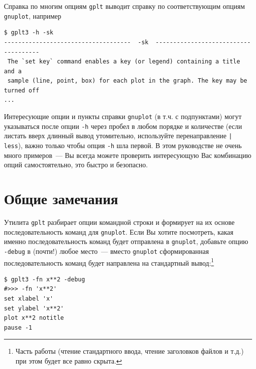 \documentclass[12pt]{article}
\def\gplt{{\tt gplt}}
\def\gnuplot{{\tt gnuplot}}
\begin{document}
Справка по многим опциям \gplt{} выводит справку по соответствующим опциям \gnuplot, например
\begin{verbatim}
$ gplt3 -h -sk
------------------------------------  -sk  -------------------------------------
 The `set key` command enables a key (or legend) containing a title and a
 sample (line, point, box) for each plot in the graph. The key may be turned off
...
\end{verbatim}

Интересующие опции и пункты справки \gnuplot{} (в т.ч. с подпунктами) могут указываться после опции \verb'-h' через пробел в любом порядке и количестве
(если листать вверх длинный вывод утомительно, используйте перенаправление \verb'| less'), важно только чтобы опция \verb'-h' шла первой.
В этом руководстве не очень много примеров~--- Вы всегда можете проверить интересующую Вас комбинацию опций самостоятельно, это быстро и безопасно. 
\pagebreak

\section{Общие замечания}\label{main:sec}
Утилита \gplt{} разбирает опции командной строки и формирует на их основе последовательность команд для \gnuplot. Если Вы хотите посмотреть,
какая именно последовательность команд будет отправлена в \gnuplot, добавьте опцию \verb'-debug' в (почти!) любое место~--- вместо \gnuplot{}
сформированная последовательность команд будет направлена на стандартный вывод:\footnote{Часть работы
  (чтение стандартного ввода, чтение заголовков файлов и т.д.) при этом будет все равно скрыта.}
\begin{figure}
  \vphantom{.}
  \vspace{-1.3cm}

\end{figure}
\begin{verbatim}
$ gplt3 -fn x**2 -debug
#>>> -fn 'x**2'
set xlabel 'x'
set ylabel 'x**2'
plot x**2 notitle   
pause -1
\end{verbatim}

\vspace{5mm}
\end{document}
